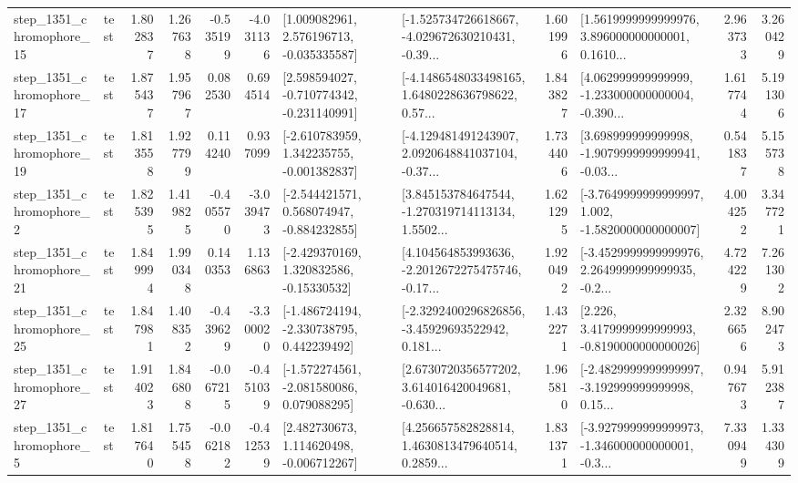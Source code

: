 \begin{tabular}{llrrrrllrlrr}
 step\_1351\_chromophore\_15 &      test &      1.802837 &    1.267638 &     -0.535199 & -4.031136 &    [1.009082961, 2.576196713, -0.035335587] &  [-1.525734726618667, -4.029672630210431, -0.39... &       1.601996 &  [1.5619999999999976, 3.896000000000001, 0.1610... &            2.963733 &          3.260429 \\
 step\_1351\_chromophore\_17 &      test &      1.875437 &    1.957967 &      0.082530 &  0.694514 &   [2.598594027, -0.710774342, -0.231140991] &  [-4.1486548033498165, 1.6480228636798622, 0.57... &       1.843827 &  [4.062999999999999, -1.233000000000004, -0.390... &            1.617744 &          5.191306 \\
 step\_1351\_chromophore\_19 &      test &      1.813558 &    1.927799 &      0.114240 &  0.937099 &   [-2.610783959, 1.342235755, -0.001382837] &  [-4.129481491243907, 2.0920648841037104, -0.37... &       1.734406 &  [3.698999999999998, -1.9079999999999941, -0.03... &            0.541837 &          5.155738 \\
  step\_1351\_chromophore\_2 &      test &      1.825395 &    1.419825 &     -0.405570 & -3.039473 &   [-2.544421571, 0.568074947, -0.884232855] &  [3.845153784647544, -1.270319714113134, 1.5502... &       1.621295 &  [-3.7649999999999997, 1.002, -1.5820000000000007] &            4.004252 &          3.347721 \\
 step\_1351\_chromophore\_21 &      test &      1.849994 &    1.990348 &      0.140353 &  1.136863 &    [-2.429370169, 1.320832586, -0.15330532] &  [4.104564853993636, -2.2012672275475746, -0.17... &       1.920492 &  [-3.4529999999999976, 2.2649999999999935, -0.2... &            4.724229 &          7.261302 \\
 step\_1351\_chromophore\_25 &      test &      1.847981 &    1.408352 &     -0.439629 & -3.300020 &   [-1.486724194, -2.330738795, 0.442239492] &  [-2.3292400296826856, -3.45929693522942, 0.181... &       1.432271 &   [2.226, 3.4179999999999993, -0.8190000000000026] &            2.326656 &          8.902473 \\
 step\_1351\_chromophore\_27 &      test &      1.914023 &    1.846808 &     -0.067215 & -0.451039 &   [-1.572274561, -2.081580086, 0.079088295] &  [2.6730720356577202, 3.614016420049681, -0.630... &       1.965810 &  [-2.4829999999999997, -3.192999999999998, 0.15... &            0.947673 &          5.912387 \\
  step\_1351\_chromophore\_5 &      test &      1.817640 &    1.755458 &     -0.062182 & -0.412539 &    [2.482730673, 1.114620498, -0.006712267] &  [4.256657582828814, 1.4630813479640514, 0.2859... &       1.831371 &  [-3.9279999999999973, -1.346000000000001, -0.3... &            7.330949 &          1.334309 \\

\end{tabular}
